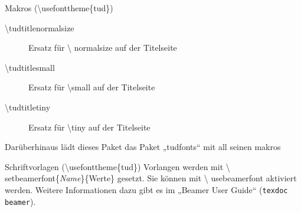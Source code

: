 \documentclass[presentation,t]{beamer}
\begin{document}
\begin{frame}[label={sec:orgad3453e}]{Makros (\textbackslash usefonttheme\{tud\})}
\begin{description}
\item[{\textbackslash tudtitlenormalsize}] Ersatz für \textbackslash
  normalsize auf der Titelseite
\item[{\textbackslash tudtitlesmall}] Ersatz für \textbackslash small auf der Titelseite
\item[{\textbackslash tudtitletiny}] Ersatz für \textbackslash tiny auf der Titelseite
\end{description}

Darüberhinaus lädt dieses Paket das Paket „tudfonts“ mit all seinen makros
\end{frame}

\begin{frame}[allowframebreaks]{Schriftvorlagen (\textbackslash usefonttheme\{tud\})}
Vorlangen werden mit \textbackslash
setbeamerfont\{\emph{Name}\}\{Werte\} gesetzt. Sie können mit \textbackslash
usebeamerfont aktiviert werden. Weitere Informationen dazu gibt es im
„Beamer User Guide“ (\texttt{texdoc beamer}).


\end{frame}
\end{document}
